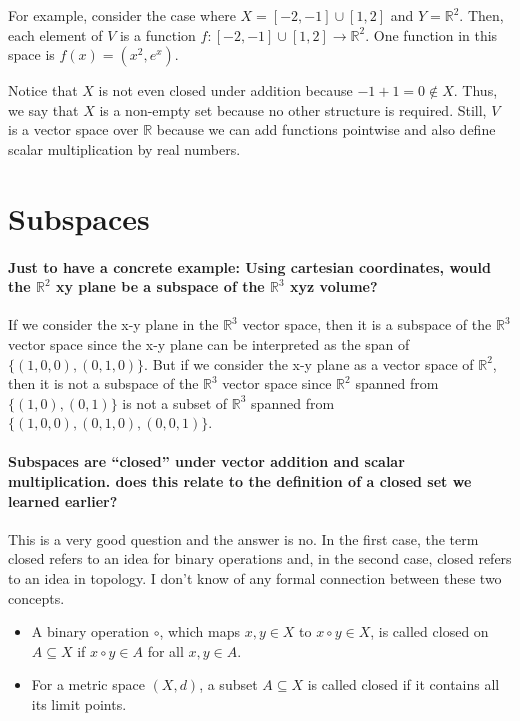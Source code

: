 \documentclass[10pt,english]{article}
\begin{document}
For example, consider the case where $X=[-2,-1]\cup[1,2]$ and $Y=\mathbb{R}^2$.
Then, each element of $V$ is a function $f\colon [-2,-1]\cup[1,2] \to \mathbb{R}^2$.
One function in this space is $f(x)= (x^2,e^x)$.

Notice that $X$ is not even closed under addition because $-1 + 1 = 0 \notin X$.
Thus, we say that $X$ is a non-empty set because no other structure is required.
Still, $V$ is a vector space over $\mathbb{R}$ because we can add functions pointwise and also define scalar multiplication by real numbers.

\section{Subspaces}

\paragraph{Just to have a concrete example: Using cartesian coordinates, would the $\mathbb{R}^2$ xy plane be a subspace of the $\mathbb{R}^3$ xyz volume?}
If we consider the x-y plane in the $\mathbb{R}^3$ vector space, then it is a subspace of the $\mathbb{R}^3$ vector space since the x-y plane can be interpreted as the span of $\{(1, 0, 0), (0, 1, 0)\}$. But if we consider the x-y plane as a vector space of $\mathbb{R}^2$, then it is not a subspace of the $\mathbb{R}^3$ vector space since $\mathbb{R}^2$ spanned from $\{(1, 0), (0, 1)\}$ is not a subset of $\mathbb{R}^3$ spanned from $\{(1, 0, 0), (0, 1, 0), (0, 0, 1)\}$.


\paragraph{Subspaces are ``closed'' under vector addition and scalar multiplication. does this relate to the definition of a closed set we learned earlier?}

This is a very good question and the answer is no.
In the first case, the term closed refers to an idea for binary operations and, in the second case, closed refers to an idea in topology.
I don't know of any formal connection between these two concepts.
\begin{itemize}
\item A binary operation $\circ$, which maps $x,y\in X$ to $x\circ y \in X$, is called closed on $A\subseteq X$ if $x\circ y \in A$ for all $x,y\in A$.

\item For a metric space $(X,d)$, a subset $A\subseteq X$ is called closed if it contains all its limit points.
\end{itemize}
\end{document}
